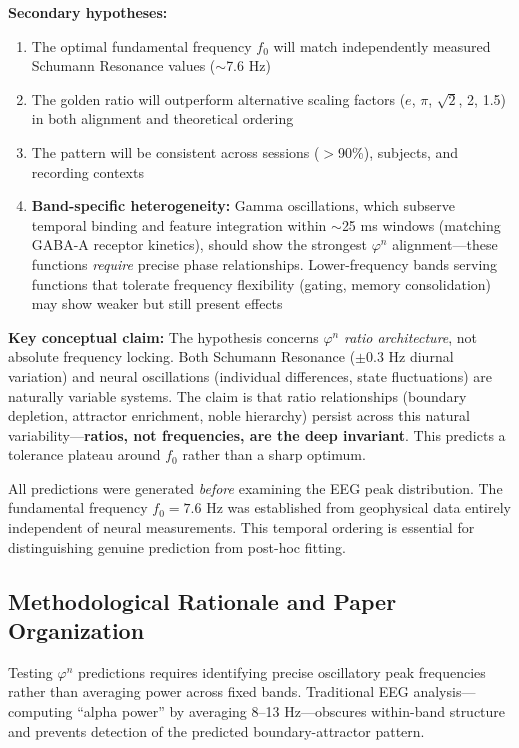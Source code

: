 \documentclass[11pt,a4paper]{article}
\newcommand{\phisym}{\varphi}
\newcommand{\fzero}{f_0}
\begin{document}
\textbf{Secondary hypotheses:}
\begin{enumerate}
    \item The optimal fundamental frequency $\fzero$ will match independently measured Schumann Resonance values ($\sim$7.6 Hz)
    \item The golden ratio will outperform alternative scaling factors ($e$, $\pi$, $\sqrt{2}$, 2, 1.5) in both alignment and theoretical ordering
    \item The pattern will be consistent across sessions ($>$90\%), subjects, and recording contexts
    \item \textbf{Band-specific heterogeneity:} Gamma oscillations, which subserve temporal binding and feature integration within $\sim$25 ms windows (matching GABA-A receptor kinetics), should show the strongest $\phisym^n$ alignment---these functions \textit{require} precise phase relationships. Lower-frequency bands serving functions that tolerate frequency flexibility (gating, memory consolidation) may show weaker but still present effects
\end{enumerate}

\textbf{Key conceptual claim:} The hypothesis concerns $\phisym^n$ \textit{ratio architecture}, not absolute frequency locking. Both Schumann Resonance ($\pm 0.3$ Hz diurnal variation) and neural oscillations (individual differences, state fluctuations) are naturally variable systems. The claim is that ratio relationships (boundary depletion, attractor enrichment, noble hierarchy) persist across this natural variability---\textbf{ratios, not frequencies, are the deep invariant}. This predicts a tolerance plateau around $\fzero$ rather than a sharp optimum.

\begin{criticalpoint}
All predictions were generated \textit{before} examining the EEG peak distribution. The fundamental frequency $\fzero = 7.6$ Hz was established from geophysical data entirely independent of neural measurements. This temporal ordering is essential for distinguishing genuine prediction from post-hoc fitting.
\end{criticalpoint}

\subsection{Methodological Rationale and Paper Organization}

Testing $\phisym^n$ predictions requires identifying precise oscillatory peak frequencies rather than averaging power across fixed bands. Traditional EEG analysis---computing ``alpha power'' by averaging 8--13 Hz---obscures within-band structure and prevents detection of the predicted boundary-attractor pattern.
\end{document}
